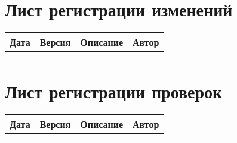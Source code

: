 \chapter*{Лист регистрации изменений}
	\begin{tabularx}{\textwidth}{
			| >{\centering\arraybackslash\hsize=2cm}X
			| >{\centering\arraybackslash\hsize=1.5cm}X
			| >{\centering\arraybackslash}X
			| >{\centering\arraybackslash\hsize=5cm}X
			|}
		\hline
		\textbf{Дата} & \textbf{Версия} & \textbf{Описание} & \textbf{Автор} \\
		\hline
		&&& \\
		\hline
	\end{tabularx}
\chapter*{Лист регистрации проверок}
	\begin{tabularx}{\textwidth}{
			| >{\centering\arraybackslash\hsize=2cm}X
			| >{\centering\arraybackslash\hsize=1.5cm}X
			| >{\centering\arraybackslash}X
			| >{\centering\arraybackslash\hsize=5cm}X
			|}
		\hline
		\textbf{Дата} & \textbf{Версия} & \textbf{Описание} & \textbf{Автор} \\
		\hline
		&&& \\
		\hline
	\end{tabularx}
